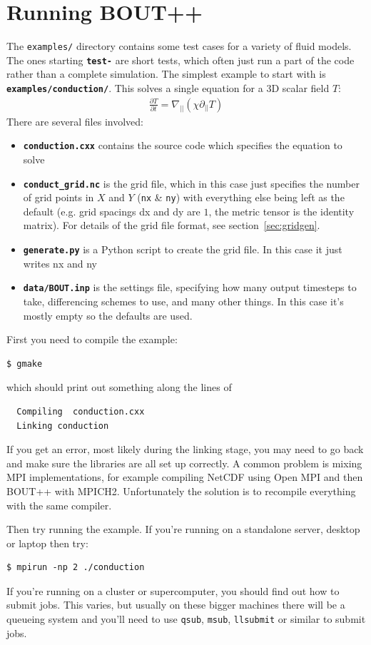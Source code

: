 \documentclass[12pt]{article}
\newcommand{\code}[1]{\texttt{#1}}
\newcommand{\file}[1]{\texttt{\bf #1}}
\def\L{\left}
\def\R{\right}
\newcommand{\deriv}[2]{\ensuremath{\frac{\partial #1}{\partial #2}}}
\begin{document}
\section{Running BOUT++}
%
\label{sec:running}
%
The \texttt{examples/} directory contains some test cases for a variety of
fluid models. The ones starting \file{test-} are short tests, which often just
run a part of the code rather than a complete simulation.  The simplest example
to start with is \file{examples/conduction/}. This solves a single equation for
a 3D scalar field $T$:
%
\begin{align}
\deriv{T}{t} = \nabla_{||}\L(\chi\partial_{||} T\R)
\end{align}
%
There are several files involved:
%
\begin{itemize}
\item \file{conduction.cxx} contains the source code which specifies the
    equation to solve
\item \file{conduct\_grid.nc} is the grid file, which in this case just specifies the number
  of grid points in $X$ and $Y$ (\code{nx} \& \code{ny}) with everything else
    being left as the default (e.g. grid spacings dx and dy are $1$, the metric
    tensor is the identity matrix). For details of the grid file format, see
    section~\ref{sec:gridgen}.
\item \file{generate.py} is a Python script to create the grid file. In this case it just
  writes nx and ny
\item \file{data/BOUT.inp} is the settings file, specifying how many output timesteps to take,
  differencing schemes to use, and many other things. In this case it's mostly
  empty so the defaults are used.
\end{itemize}
%
First you need to compile the example:
%
\begin{verbatim}
$ gmake
\end{verbatim}
%
which should print out something along the lines of
%
\begin{verbatim}
  Compiling  conduction.cxx
  Linking conduction
\end{verbatim}
%
If you get an error, most likely during the linking stage, you may need to go
back and make sure the libraries are all set up correctly. A common problem is
mixing MPI implementations, for example compiling NetCDF using Open MPI and
then BOUT++ with MPICH2. Unfortunately the solution is to recompile everything
with the same compiler.

Then try running the example. If you're running on a standalone server, desktop
or laptop then try:
%
\begin{verbatim}
$ mpirun -np 2 ./conduction
\end{verbatim}
%
If you're running on a cluster or supercomputer, you should find out how to
submit jobs. This varies, but usually on these bigger machines there will be a
queueing system and you'll need to use \code{qsub}, \code{msub},
\code{llsubmit} or similar to submit jobs.
\end{document}
